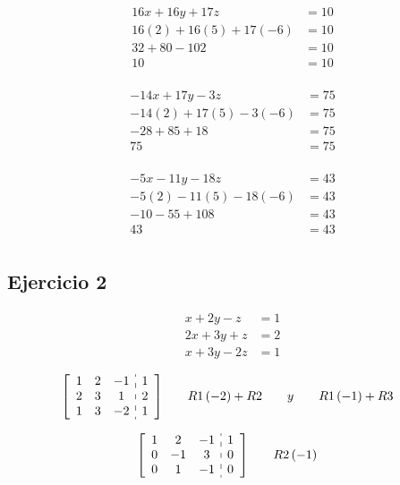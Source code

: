 \documentclass[fleqn]{article}
\begin{document}
    \begin{align*}
      16x+16y+17z&=10 \\
      16(2)+16(5)+17(-6)&=10 \\
      32+80-102&=10 \\
      10&=10 \\
    \end{align*}
    
    \begin{align*}
      -14x+17y-3z&=75 \\
      -14(2)+17(5)-3(-6)&=75 \\
      -28+85+18&=75 \\
      75&=75 \\
    \end{align*}
  
    \begin{align*}
      -5x-11y-18z&=43 \\
      -5(2)-11(5)-18(-6)&=43 \\
      -10-55+108&=43  \\
      43&=43 \\
    \end{align*}

  \subsection{Ejercicio 2}
    \begin{align*}
      x+2y-z&=1 \\
      2x+3y+z&=2  \\
      x+3y-2z&=1
    \end{align*}
    
    \begin{alignat*}{2}
      &\left[
        \begin{array}{ccc:c}
          1 & 2 & -1 & 1 \\
          2 & 3 & 1 & 2 \\
          1 & 3 & -2 & 1  
        \end{array}
      \right]
      \quad
      && R1\left(-2\right)+R2 \qquad y \qquad R1\left(-1\right)+R3
    \end{alignat*}

    \begin{alignat*}{2}
      &\left[
        \begin{array}{ccc:c}
          1 & 2 & -1 & 1 \\
          0 & -1 & 3 & 0 \\
          0 & 1 & -1 & 0
        \end{array}
      \right]
      \quad
      && R2\left(-1\right)
    \end{alignat*}
    
\end{document}
